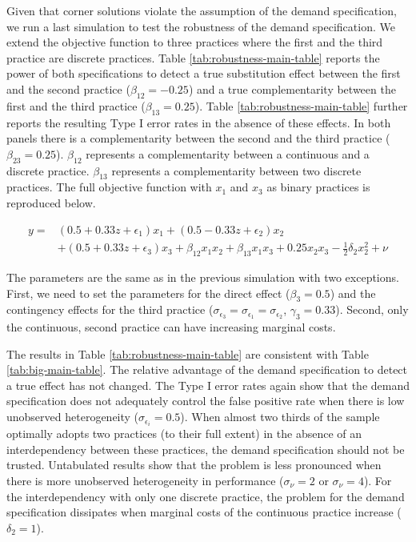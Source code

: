 \documentclass[12pt]{article}
\begin{document}
Given that corner solutions violate the assumption of the demand specification, we run a last simulation to test the robustness of the demand specification. We extend the objective function to three practices where the first and the third practice are discrete practices. Table \ref{tab:robustness-main-table} reports the power of both specifications to detect a true substitution effect between the first and the second practice ($\beta_{12} = -0.25$) and a true complementarity between the first and the third practice ($\beta_{13} = 0.25$). Table \ref{tab:robustness-main-table} further reports the resulting Type I error rates in the absence of these effects. In both panels there is a complementarity between the second and the third practice ($\beta_{23} = 0.25$). $\beta_{12}$ represents a complementarity between a continuous and a discrete practice. $\beta_{13}$ represents a complementarity between two discrete practices. The full objective function with $x_1$ and $x_3$ as binary practices is reproduced below.

\begin{align*}
\label{eq:contingent-complement}
y = &(0.5 + 0.33 z + \epsilon_1) x_1 + (0.5 - 0.33 z + \epsilon_2) x_2 \\ 
    &+ (0.5 + 0.33 z + \epsilon_3) x_3 
    + \beta_{12} x_1 x_2 + \beta_{13} x_1 x_3  + 0.25 x_2 x_3 
    - \frac{1}{2} \delta_2 x^2_2 + \nu
\end{align*}


The parameters are the same as in the previous simulation with two exceptions. First, we need to set the parameters for the direct effect ($\beta_3 = 0.5$) and the contingency effects for the third practice ($\sigma_{\epsilon_3} = \sigma_{\epsilon_1} = \sigma_{\epsilon_2}$, $\gamma_3 = 0.33$). Second, only the continuous, second practice can have increasing marginal costs. 

The results in Table \ref{tab:robustness-main-table} are consistent with Table \ref{tab:big-main-table}. The relative advantage of the demand specification to detect a true effect has not changed. The Type I error rates again show that the demand specification does not adequately control the false positive rate when there is low unobserved heterogeneity ($\sigma_{\epsilon_i} = 0.5$). When almost two thirds of the sample optimally adopts two practices (to their full extent) in the absence of an interdependency between these practices, the demand specification should not be trusted. Untabulated results show that the problem is less pronounced when there is more unobserved heterogeneity in performance ($\sigma_{\nu} = 2$ or $\sigma_{\nu} = 4$). For the interdependency with only one discrete practice, the problem for the demand specification dissipates when marginal costs of the continuous practice increase ($\delta_2 = 1$). 
\end{document}
